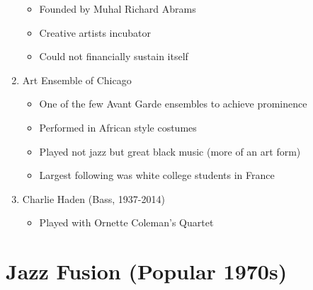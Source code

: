 \documentclass[]{article}
\providecommand{\tightlist}{%
  \setlength{\itemsep}{0pt}\setlength{\parskip}{0pt}}
\begin{document}
\begin{enumerate}
  \begin{itemize}
  \tightlist
  \item
    Founded by Muhal Richard Abrams
  \item
    Creative artists incubator
  \item
    Could not financially sustain itself
  \end{itemize}
\item
  Art Ensemble of Chicago

  \begin{itemize}
  \tightlist
  \item
    One of the few Avant Garde ensembles to achieve prominence
  \item
    Performed in African style costumes
  \item
    Played not jazz but great black music (more of an art form)
  \item
    Largest following was white college students in France
  \end{itemize}
\item
  Charlie Haden (Bass, 1937-2014)

  \begin{itemize}
  \tightlist
  \item
    Played with Ornette Coleman's Quartet
  \end{itemize}
\end{enumerate}

\section{Jazz Fusion (Popular 1970s)}\label{jazz-fusion-popular-1970s}
\end{document}
